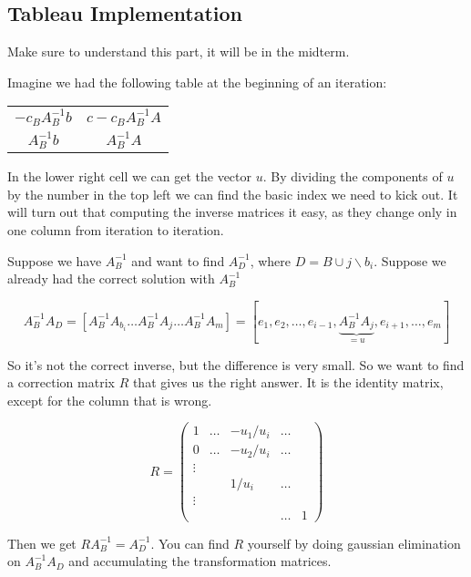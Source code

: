 \subsection*{Tableau Implementation}

Make sure to understand this part, it will be in the midterm.

Imagine we had the following table at the beginning of an iteration:

\begin{center}
\begin{tabular}{c|c}
$-c_BA_B^{-1}b$ & $c-c_BA_B^{-1}A$\\
$A^{-1}_B b$ & $A_B^{-1}A$
\end{tabular}
\end{center}

In the lower right cell we can get the vector $u$. By dividing the components of $u$ by the number in the top left we can find the basic index we need to kick out. It will turn out that computing the inverse matrices it easy, as they change only in one column from iteration to iteration.

Suppose we have $A_B^{-1}$ and want to find $A_D^{-1}$, where $D=B\cup j \backslash b_i$. Suppose we already had the correct solution with $A_B^{-1}$ 

\[A_B^{-1}A_D = \left[ A_B^{-1}A_{b_i}\ldots A_B^{-1}A_j\ldots A_B^{-1}A_m\right] = \left[ e_1,e_2, \ldots, e_{i-1}, \underbrace{A_B^{-1}A_j}_{=u}, e_{i+1},\ldots, e_m\right]\]

So it's not the correct inverse, but the difference is very small. So we want to find a correction matrix $R$ that gives us the right answer. It is the identity matrix, except for the column that is wrong.

\[R= \begin{pmatrix} %
1 & \ldots & -u_1/u_i & \ldots \\
0 & \ldots & -u_2/u_i & \ldots \\
\vdots \\
& & 1/u_i & \ldots\\
\vdots\\
& & & \ldots & 1
\end{pmatrix}\]

Then we get $RA_B^{-1} = A_D^{-1}$. You can find $R$ yourself by doing gaussian elimination on $A_B^{-1}A_D$ and accumulating the transformation matrices.

